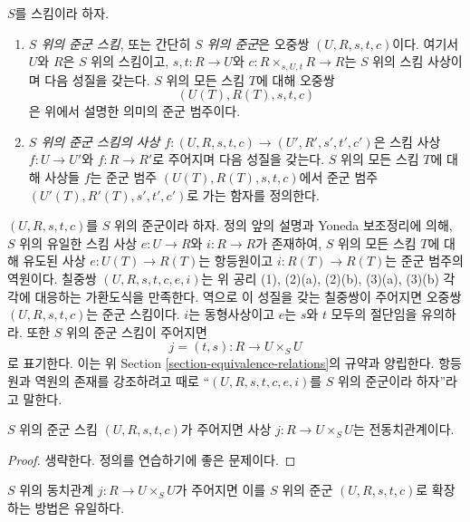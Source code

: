 \begin{definition}
\label{definition-groupoid}
$S$를 스킴이라 하자.
\begin{enumerate}
\item {\it $S$ 위의 준군 스킴}, 또는 간단히 {\it $S$ 위의 준군}은 오중쌍 $(U, R, s, t, c)$이다.
여기서 $U$와 $R$은 $S$ 위의 스킴이고, $s, t : R \to U$와 $c : R \times_{s, U, t} R \to R$는
$S$ 위의 스킴 사상이며 다음 성질을 갖는다. $S$ 위의 모든 스킴 $T$에 대해 오중쌍
$$
(U(T), R(T), s, t, c)
$$
은 위에서 설명한 의미의 준군 범주이다.
\item {\it $S$ 위의 준군 스킴의 사상
$f : (U, R, s, t, c) \to (U', R', s', t', c')$}은 스킴 사상 $f : U \to U'$와 $f : R \to R'$로 주어지며
다음 성질을 갖는다. $S$ 위의 모든 스킴 $T$에 대해 사상들 $f$는 준군 범주 $(U(T), R(T), s, t, c)$에서
준군 범주 $(U'(T), R'(T), s', t', c')$로 가는 함자를 정의한다.
\end{enumerate}
\end{definition}

\noindent
$(U, R, s, t, c)$를 $S$ 위의 준군이라 하자. 정의 앞의 설명과 Yoneda 보조정리에 의해, $S$ 위의 유일한 스킴 사상
$e : U \to R$와 $i : R \to R$가 존재하여, $S$ 위의 모든 스킴 $T$에 대해 유도된 사상
$e : U(T) \to R(T)$는 항등원이고 $i : R(T) \to R(T)$는 준군 범주의 역원이다. 칠중쌍
$(U, R, s, t, c, e, i)$는 위 공리 (1), (2)(a), (2)(b), (3)(a), (3)(b) 각각에 대응하는 가환도식을 만족한다.
역으로 이 성질을 갖는 칠중쌍이 주어지면 오중쌍 $(U, R, s, t, c)$는 준군 스킴이다. $i$는 동형사상이고
$e$는 $s$와 $t$ 모두의 절단임을 유의하라. 또한 $S$ 위의 준군 스킴이 주어지면
$$
j = (t, s) : R \longrightarrow U \times_S U
$$
로 표기한다. 이는 위 Section \ref{section-equivalence-relations}의 규약과 양립한다. 항등원과 역원의 존재를 강조하려고
때로 ``$(U, R, s, t, c, e, i)$를 $S$ 위의 준군이라 하자''라고 말한다.

\begin{lemma}
\label{lemma-groupoid-pre-equivalence}
$S$ 위의 준군 스킴 $(U, R, s, t, c)$가 주어지면 사상 $j : R \to U \times_S U$는 전동치관계이다.
\end{lemma}

\begin{proof}
생략한다. 정의를 연습하기에 좋은 문제이다.
\end{proof}

\begin{lemma}
\label{lemma-equivalence-groupoid}
$S$ 위의 동치관계 $j : R \to U \times_S U$가 주어지면 이를 $S$ 위의 준군 $(U, R, s, t, c)$로
확장하는 방법은 유일하다.
\end{lemma}


